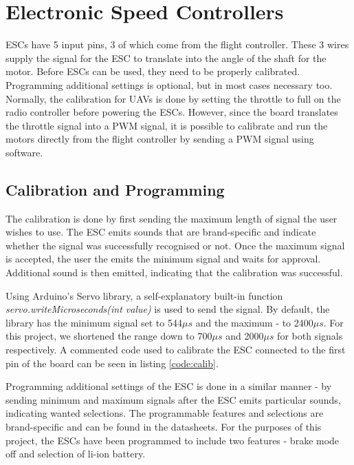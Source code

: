 \section{Electronic Speed Controllers}
ESCs have 5 input pins, 3 of which come from the flight controller. These 3 wires supply the signal for the ESC to translate into the angle of the shaft for the motor. Before ESCs can be used, they need to be properly calibrated. Programming additional settings is optional, but in most cases necessary too. Normally, the calibration for UAVs is done by setting the throttle to full on the radio controller before powering the ESCs. However, since the board translates the throttle signal into a PWM signal, it is possible to calibrate and run the motors directly from the flight controller by sending a PWM signal using software.

\subsection{Calibration and Programming}
The calibration is done by first sending the maximum length of signal the user wishes to use. The ESC emits sounds that are brand-specific and indicate whether the signal was successfully recognised or not. Once the maximum signal is accepted, the user the emits the minimum signal and waits for approval. Additional sound is then emitted, indicating that the calibration was successful.

Using Arduino's Servo library, a self-explanatory built-in function \textit{servo.writeMicroseconds(int value)} is used to send the signal. By default, the library has the minimum signal set to 544$\mu s$ and the maximum - to 2400$\mu s$. For this project, we shortened the range down to 700$\mu s$ and 2000$\mu s$ for both signals respectively. A commented code used to calibrate the ESC connected to the first pin of the board can be seen in listing \ref{code:calib}.



Programming additional settings of the ESC is done in a similar manner - by sending minimum and maximum signals after the ESC emits particular sounds, indicating wanted selections. The programmable features and selections are brand-specific and can be found in the datasheets. For the purposes of this project, the ESCs have been programmed to include two features - brake mode off and selection of li-ion battery.


